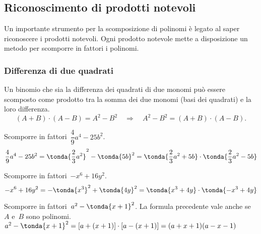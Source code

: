 % 


\subsection{Riconoscimento di prodotti notevoli}
\label{subsec:divpol_prodnot}

Un importante strumento per la scomposizione di polinomi è legato al saper 
riconoscere i prodotti notevoli.
Ogni prodotto notevole mette a disposizione un metodo per scomporre in 
fattori i polinomi.

\subsubsection{Differenza di due quadrati}
\label{subsubsec:divpol_difquad}

Un binomio che sia la differenza dei quadrati di due monomi può essere 
scomposto come prodotto tra la somma dei due monomi (basi dei quadrati) e 
la loro differenza.
\begin{equation*}
(A+B)\cdot (A-B)=
A^{2}-B^{2}\quad \Rightarrow \quad A^{2}-B^{2}=(A+B)\cdot (A-B).
\end{equation*}

 \begin{esempio}
Scomporre in fattori~\(\dfrac{4}{9}a^{4}-25b^{2}\).
\[\dfrac{4}{9}a^{4}-25b^{2}=
  \tonda{\dfrac{2}{3}a^{2}}^{2}-\tonda{5b}^{2}=
  \tonda{\dfrac{2}{3}a^{2}+5b}\cdot \tonda{\dfrac{2}{3}a^{{2}}-5b}\]
 \end{esempio}

 \begin{esempio}
Scomporre in fattori~\(-x^6+16y^{2}\).
\[-x^6+16y^{2}=-\tonda{x^3}^{2}+\tonda{4y}^{2}=
  \tonda{x^3+4y}\cdot \tonda{-x^3+4y}\]
 \end{esempio}

 \begin{esempio}
Scomporre in fattori~\(a^{2}-\tonda{x+1}^{2}\).
La formula precedente vale anche se~\(A\) e~\(B\) sono polinomi. 
\(a^{2}-\tonda{x+1}^{2}=
 \left[a+(x+1)\right]\cdot \left[a-(x+1)\right]=(a+x+1)(a-x-1)\)
\end{esempio}

